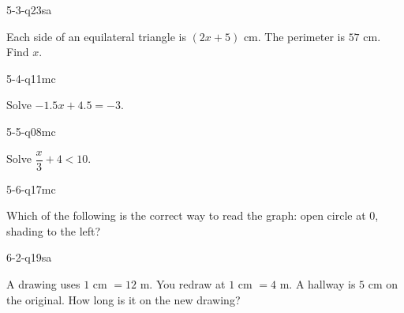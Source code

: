\begin{practiceQuestion}{5-3-q23}{sa}
\begin{questionText}
Each side of an equilateral triangle is $(2x + 5)$ cm. The perimeter is $57$ cm. Find $x$.
\end{questionText}
\end{practiceQuestion}

\begin{practiceQuestion}{5-4-q11}{mc}
\begin{questionText}
Solve $-1.5x + 4.5 = -3$.
\end{questionText}
\end{practiceQuestion}

\begin{practiceQuestion}{5-5-q08}{mc}
\begin{questionText}
Solve $\dfrac{x}{3} + 4 < 10$.
\end{questionText}
\end{practiceQuestion}

\begin{practiceQuestion}{5-6-q17}{mc}
\begin{questionText}
Which of the following is the correct way to read the graph: open circle at $0$, shading to the left?
\end{questionText}
\end{practiceQuestion}

\begin{practiceQuestion}{6-2-q19}{sa}
\begin{questionText}
A drawing uses $1$ cm $= 12$ m. You redraw at $1$ cm $= 4$ m. A hallway is $5$ cm on the original. How long is it on the new drawing?
\end{questionText}
\end{practiceQuestion}

